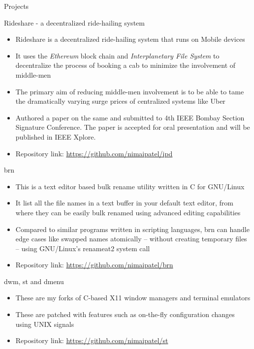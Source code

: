 \documentclass{article}
\newlength{\tabin}
\newlength{\secsep}
\newcommand{\lineunder}{\vspace*{-8pt} \\ \hspace*{-6pt} \hrulefill \\ \vspace*{-15pt}}
\newenvironment{tabbedsection}[1]{
	\begin{list}{}{
		\setlength{\itemsep}{0pt}
		\setlength{\labelsep}{0pt}
		\setlength{\labelwidth}{0pt}
		\setlength{\leftmargin}{\tabin}
		\setlength{\rightmargin}{\tabin}
		\setlength{\listparindent}{0pt}
		\setlength{\parsep}{0pt}
		\setlength{\parskip}{0pt}
		\setlength{\partopsep}{0pt}
		\setlength{\topsep}{#1}
	}
	\item[]
}{\end{list}}
\newenvironment{resume_section}[1]{
	\filbreak
	\vspace{2\secsep}
	\textsc{\large#1}
	\lineunder
	\begin{tabbedsection}{\secsep}
}{\end{tabbedsection}}
\newenvironment{resume_subsection}[2][]{
	\textbf{#2} \hfill {\footnotesize #1} \hspace{2em}
	\begin{tabbedsection}{0.5\secsep}
}{\end{tabbedsection}}
\newenvironment{subitems}{
	\renewcommand{\labelitemi}{-}
	\begin{itemize}
		\setlength{\labelsep}{1em}
}{\end{itemize}}
\begin{document}
\begin{resume_section}{Projects}

	\begin{resume_subsection}{Rideshare - a decentralized ride-hailing system}
		\begin{subitems}
			\item Rideshare is a decentralized ride-hailing system
				that runs on Mobile devices
			\item It uses the \textit{Ethereum} block chain and
				\textit{Interplanetary File System} to decentralize the
				process of booking a cab to minimize the
				involvement of middle-men
			\item The primary aim of reducing middle-men involvement
				is to be able to tame the dramatically varying
				surge prices of centralized systems like Uber
			\item Authored a paper on the same and submitted to 4th IEEE Bombay Section Signature Conference. 
				The paper is accepted for oral presentation and will be published in IEEE Xplore.
			\item Repository link:
				\href{https://github.com/nimaipatel/ipd}{https://github.com/nimaipatel/ipd}
		\end{subitems}
	\end{resume_subsection}

	\begin{resume_subsection}{brn}
		\begin{subitems}
			\item This is a text editor based bulk rename utility
				written in C for GNU/Linux
			\item It list all the file names in a text buffer in your
				default text editor, from where they can be easily
				bulk renamed using advanced editing
				capabilities
			\item Compared to similar programs written in scripting
				languages, brn can handle edge cases like
				swapped names atomically -- without creating
				temporary files -- using GNU/Linux's renameat2
				system call
			\item Repository link: \href{https://github.com/nimaipatel/brn}{https://github.com/nimaipatel/brn}
		\end{subitems}
	\end{resume_subsection}

	\begin{resume_subsection}{dwm, st and dmenu}
		\begin{subitems}
			\item These are my forks of C-based X11 window managers and terminal emulators
			\item These are patched with features such as on-the-fly configuration changes using UNIX signals
			\item Repository link: \href{https://github.com/nimaipatel/st}{https://github.com/nimaipatel/st}
		\end{subitems}
	\end{resume_subsection}


\end{resume_section}
\end{document}
